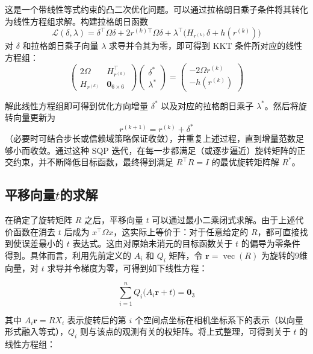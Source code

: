 这是一个带线性等式约束的凸二次优化问题。可以通过拉格朗日乘子条件将其转化为线性方程组求解。构建拉格朗日函数
\begin{equation}
	\mathcal{L}(\delta, \lambda) 
	=  
	\delta^\top \Omega  \delta 
	+  
	2 r^{(k)\top}\Omega \delta 
	+ 
	\lambda^\top \bigl(H_{r^{(k)}} \delta + h(r^{(k)})\bigr)
\end{equation}
对 $\delta$ 和拉格朗日乘子向量 $\lambda$ 求导并令其为零，即可得到 KKT 条件所对应的线性方程组：
\begin{equation}
	\begin{pmatrix}
		2 \Omega & H_{r^{(k)}}^\top \\
		H_{r^{(k)}} & \mathbf{0}_{6\times 6}
	\end{pmatrix}
	\begin{pmatrix}
		\delta^* \\
		\lambda^*
	\end{pmatrix}
	= 
	\begin{pmatrix}
		- 2 \Omega r^{(k)} \\
		- h(r^{(k)})
	\end{pmatrix}
\end{equation}

解此线性方程组即可得到优化方向增量 $\delta^*$ 以及对应的拉格朗日乘子 $\lambda^*$。然后将旋转向量更新为
\begin{equation}
	r^{(k+1)} 
	= 
	r^{(k)} + \delta^*
\end{equation}
（必要时可结合步长或信赖域策略保证收敛），并重复上述过程，直到增量范数足够小而收敛。通过这种 SQP 迭代，在每一步都满足（或逐步逼近）旋转矩阵的正交约束，并不断降低目标函数，最终得到满足 $R^\top R=I$ 的最优旋转矩阵解 $R^*$。
\subsection{平移向量$t$的求解}
在确定了旋转矩阵 $R$ 之后，平移向量 $t$ 可以通过最小二乘闭式求解。由于上述代价函数在消去 $t$ 后成为 $x^\top \Omega x$，这实际上等价于：对于任意给定的 $R$，都可直接找到使误差最小的 $t$ 表达式。这由对原始未消元的目标函数关于 $t$ 的偏导为零条件得到。具体而言，利用先前定义的 $A_i$ 和 $Q_i$ 矩阵，令 $\mathbf{r} = \operatorname{vec}(R)$ 为旋转的9维向量，对 $t$ 求导并令梯度为零，可得到如下线性方程：

\begin{equation} 
	\sum_{i=1}^n Q_i \big(A_i \mathbf{r} + t\big) =  \mathbf{0}_3
\end{equation}

其中 $A_i \mathbf{r} = R X_i$ 表示旋转后的第 $i$ 个空间点坐标在相机坐标系下的表示（以向量形式融入等式），$Q_i$ 则与该点的观测有关的权矩阵。将上式整理，可得到关于 $t$ 的线性方程组：

